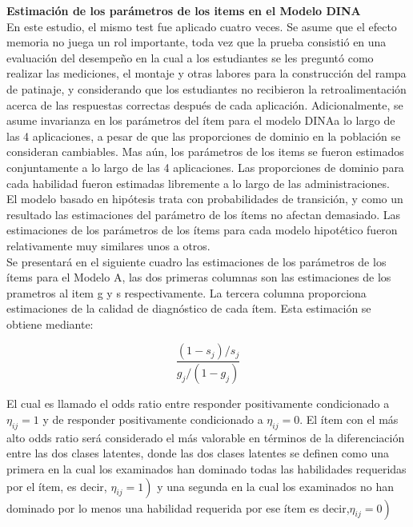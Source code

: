 \noindent
\textbf{Estimaci\'{o}n de los par\'{a}metros de los items en el Modelo DINA}\\
En este estudio, el mismo test fue aplicado cuatro veces. Se asume que el efecto memoria no juega un rol importante, toda vez que la prueba consisti\'{o} en una evaluaci\'{o}n del desempe\~{n}o en la cual a los estudiantes se les pregunt\'{o} como realizar las mediciones, el montaje y otras labores para la construcci\'{o}n del rampa de patinaje, y considerando que los estudiantes no recibieron la retroalimentaci\'{o}n acerca de las respuestas correctas despu\'{e}s de cada aplicaci\'{o}n. Adicionalmente, se asume invarianza en los par\'{a}metros del \'{i}tem para el modelo DINAa lo largo de las 4 aplicaciones, a pesar de que las proporciones de dominio en la poblaci\'{o}n se consideran cambiables.
Mas a\'{u}n, los par\'{a}metros de los items se fueron estimados conjuntamente a lo largo de las 4 aplicaciones. Las proporciones de dominio para cada habilidad fueron estimadas libremente a lo largo de las administraciones.\\
El modelo basado en hip\'{o}tesis trata con probabilidades de transici\'{o}n, y como un resultado las estimaciones del par\'{a}metro de los \'{i}tems no afectan demasiado. Las estimaciones de los par\'{a}metros de los \'{i}tems para cada modelo hipot\'{e}tico fueron relativamente muy similares unos a otros.\\
Se presentar\'{a} en el siguiente cuadro las estimaciones de los par\'{a}metros de los \'{i}tems para el Modelo A, las dos primeras columnas son las estimaciones de los prametros al item g y s respectivamente. La tercera columna proporciona estimaciones de la calidad de diagn\'{o}stico de cada \'{i}tem. Esta estimaci\'{o}n se obtiene mediante:

\begin{equation}
	\frac{\left(1-s_{j}\right) / s_{j}}{g_{j} /\left(1-g_{j}\right)}  
	\label{4.1}
\end{equation}           

El cual es llamado el odds ratio entre responder positivamente condicionado a $\eta_{i j}=1$ y de responder positivamente condicionado a $\eta_{i j}=0$. El \'{i}tem con el m\'{a}s alto odds ratio ser\'{a} considerado el m\'{a}s valorable en t\'{e}rminos de la diferenciaci\'{o}n entre las dos clases latentes, donde las dos clases latentes se definen como una primera en la cual los examinados han dominado todas las habilidades requeridas por el \'{i}tem, es decir, $\left.\eta_{i j}=1\right)$ y una segunda en la cual los examinados no han dominado por lo menos una habilidad requerida  por ese \'{i}tem es decir,$\left.\eta_{i j}=0\right)$\\

